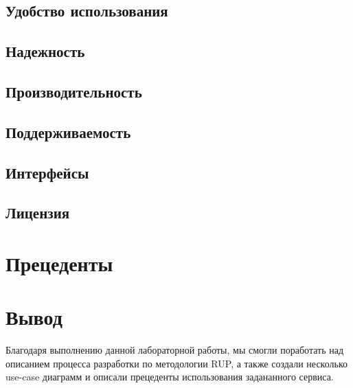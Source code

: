 \documentclass{article}
\begin{document}
\subsection{Удобство использования}


\subsection{Надежность}


\subsection{Производительность}


\subsection{Поддерживаемость}


\subsection{Интерфейсы}


\subsection{Лицензия}


\section{Прецеденты}


\section{Вывод}
Благодаря выполнению данной лабораторной работы,
мы смогли поработать над описанием процесса разработки
по методологии RUP, а также создали несколько use-case
диаграмм и описали прецеденты использования задананного
сервиса.
\end{document}
